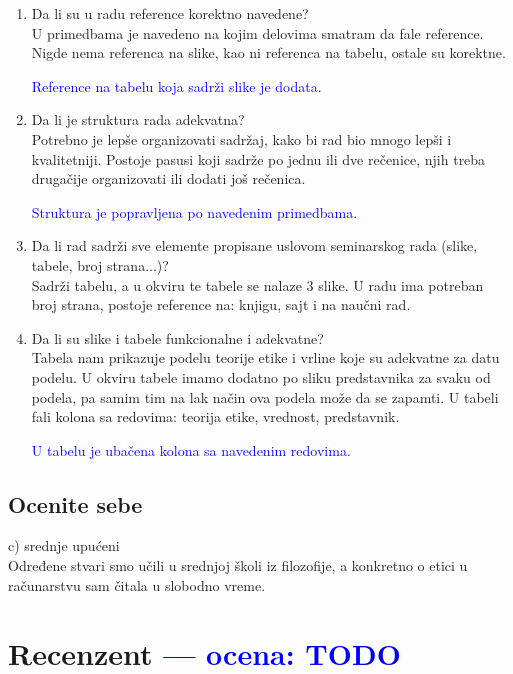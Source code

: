 \documentclass[a4paper]{report}
\newcommand{\odgovor}[1]{\textcolor{blue}{#1}}
\begin{document}
\begin{enumerate}
\item Da li su u radu reference korektno navedene?\\
U primedbama je navedeno na kojim delovima smatram da fale reference. Nigde nema referenca na slike, kao ni referenca na tabelu, ostale su korektne.

\odgovor{Reference na tabelu koja sadrži slike je dodata.}

\item Da li je struktura rada adekvatna?\\
Potrebno je lepše organizovati sadržaj, kako bi rad bio mnogo lepši i kvalitetniji. Postoje pasusi koji sadrže po jednu ili dve rečenice, njih treba drugačije organizovati ili dodati još rečenica.

\odgovor{Struktura je popravljena po navedenim primedbama.}

\item Da li rad sadrži sve elemente propisane uslovom seminarskog rada (slike, tabele, broj strana...)?\\ Sadrži tabelu, a u okviru te tabele se nalaze 3 slike. U radu ima potreban broj strana, postoje reference na: knjigu, sajt i na naučni rad.

\item Da li su slike i tabele funkcionalne i adekvatne?\\ Tabela nam prikazuje podelu teorije etike i vrline koje su adekvatne za datu podelu. U okviru tabele imamo dodatno po sliku predstavnika za svaku od podela, pa samim tim na lak način ova podela može da se zapamti. U tabeli fali kolona sa redovima: teorija etike, vrednost, predstavnik.

\odgovor{U tabelu je ubačena kolona sa navedenim redovima.}

\end{enumerate}

\section{Ocenite sebe}
c) srednje upućeni
  \\ Određene stvari smo učili u srednjoj školi iz filozofije, a konkretno o etici u računarstvu sam čitala u slobodno vreme.

\chapter{Recenzent \odgovor{--- ocena: TODO} }
\end{document}
